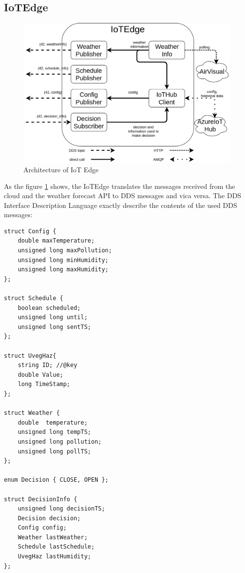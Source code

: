 \documentclass{article}
\begin{document}
\subsection{IoTEdge}
\begin{figure}[!htb]
  \includegraphics[width=\linewidth]{imgs/edge.png}
  \caption{Architecture of IoT Edge}
  \label{fig:arc_edge}
\end{figure}

As the figure \ref{fig:arc_edge} shows, the IoTEdge translates the messages received from the cloud and the weather forecast API to DDS messages and vica versa. The DDS Interface Description Language exactly describe the contents of the used DDS messages:
\begin{verbatim}
struct Config {
    double maxTemperature;
    unsigned long maxPollution;
    unsigned long minHumidity;
    unsigned long maxHumidity;
};

struct Schedule {
    boolean scheduled;
    unsigned long until;
    unsigned long sentTS;
};

struct UvegHaz{
    string ID; //@key
    double Value;
    long TimeStamp;
};

struct Weather {
    double  temperature;
    unsigned long tempTS;
    unsigned long pollution;
    unsigned long pollTS;
};

enum Decision { CLOSE, OPEN };

struct DecisionInfo {
    unsigned long decisionTS;
    Decision decision;
    Config config;
    Weather lastWeather;
    Schedule lastSchedule;
    UvegHaz lastHumidity;
};
\end{verbatim}
\end{document}

